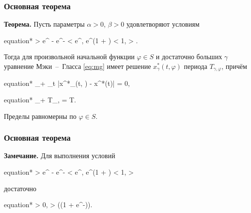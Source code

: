 \begin{frame}
	\frametitle{Основная теорема}
	
	\textbf{Теорема.} Пусть параметры $\alpha > 0$, $\beta > 0$ удовлетворяют условиям
	\footnotesize
	\begin{empheq}[box=\myeq]{equation*}
		\alpha > e^{\beta} - e^{-\beta}  \alpha < \beta e^{\beta}, \quad 
		\frac{\alpha}{\beta}e^{\beta}\left(1 + \ln\frac{\beta}{\alpha}\right) < 1, \quad 
		\alpha > .
	\end{empheq}
	\normalsize
	Тогда для произвольной начальной функции $\varphi \in S$ и достаточно больших $\gamma$ уравнение Мэки~--~Гласса \eqref{eq:mg} имеет решение $x^*_\gamma(t, \varphi)$ периода $T_{\gamma, \varphi}$, причём
	
	\small
	\begin{empheq}[box=\myeq]{equation*}
	\lim\limits_{\gamma \to +\infty} \max\limits_{t } |x^*_\gamma(t, \varphi) - x^*(t)| = 0,
	\end{empheq}
	
	\begin{empheq}[box=\myeq]{equation*}
	\lim\limits_{\gamma \to +\infty} T_{\gamma, \varphi} = T.
	\end{empheq}
	\normalsize
	
	Пределы равномерны по $\varphi \in S$.
	
\end{frame}

\begin{frame}
	\frametitle{Основная теорема}
	
	\textbf{Замечание.} Для выполнения условий
	\footnotesize
	\begin{empheq}[box=\myeq]{equation*}
		\alpha > e^{\beta} - e^{-\beta}  \alpha < \beta e^{\beta}, \quad 
		\frac{\alpha}{\beta}e^{\beta}\left(1 + \ln\frac{\beta}{\alpha}\right) < 1, \quad 
		\alpha > 
	\end{empheq}
	\normalsize
	достаточно
	\begin{empheq}[box=\myeq]{equation*}
		\beta > 0, \quad \alpha > \exp(\beta(1 + e^{-\beta})).
	\end{empheq}
	
\end{frame}

